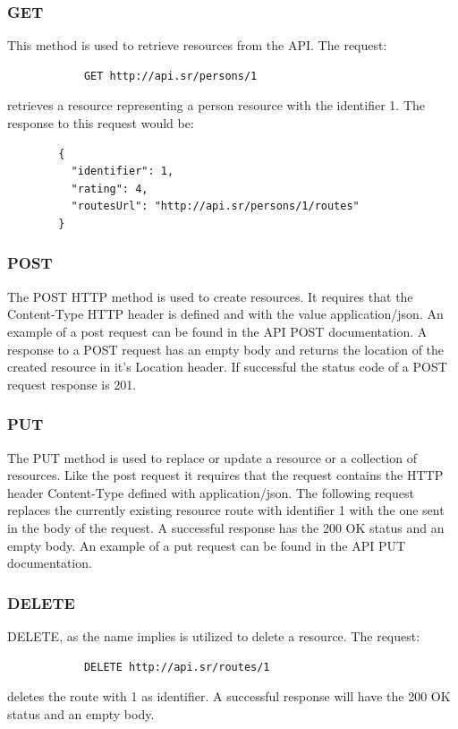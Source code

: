         \subsubsection*{GET}
        This method is used to retrieve resources from the API. The request: 
        \begin{verbatim}
            GET http://api.sr/persons/1 
        \end{verbatim}
        \vspace{-\baselineskip}
        retrieves a resource representing a person resource with the identifier 1. 
        The response to this request would be:
        \begin{lstlisting}
        {
          "identifier": 1,
          "rating": 4,
          "routesUrl": "http://api.sr/persons/1/routes"
        }
        \end{lstlisting}

        \subsubsection*{POST}
        The POST HTTP method is used to create resources. It requires that the Content-Type\cite{contenttype} HTTP header is 
        defined and with the value application/json\cite{applicationjson}. An example of a post request can be found in the 
        API POST\cite{apipostdocs} documentation. A response to a POST request has an empty body and returns the 
        location of the created resource in it's Location header. If successful the status code of a POST request response is 201.  
            
        \subsubsection*{PUT}
        The PUT method is used to replace or update a resource or a collection of resources. Like the post request it requires 
        that the request contains the HTTP header Content-Type defined with application/json.
        The following request replaces the currently existing resource route with identifier 1 with the one sent in 
        the body of the request. A successful response has the 200 OK status and an empty body. An example of a put 
        request can be found in the API PUT\cite{apiputdocs} documentation.

        \subsubsection*{DELETE}
        DELETE, as the name implies is utilized to delete a resource. The request: 
        \begin{verbatim}
            DELETE http://api.sr/routes/1
        \end{verbatim}
        \vspace{-\baselineskip}
        deletes the route with 1 as identifier. A successful response will have the 200 OK status and an empty body.
    
